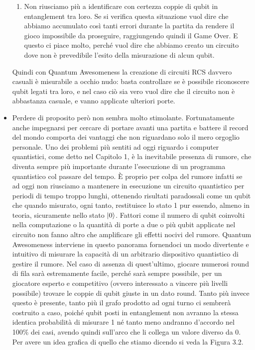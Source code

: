 \documentclass{book}
\theoremstyle{definition}
\theoremstyle{definition}
\theoremstyle{definition}
\theoremstyle{plain}
\theoremstyle{plain}
\theoremstyle{plain}
\theoremstyle{plain}
\begin{document}
\begin{itemize}
\begin{enumerate}
        \item Non riusciamo più a identificare con certezza coppie di qubit in entanglement tra loro. Se si verifica questa situazione vuol dire che abbiamo accumulato così tanti errori durante la partita da rendere il gioco impossibile da proseguire, raggiungendo quindi il Game Over. E questo ci piace molto, perché vuol dire che abbiamo creato un circuito dove non è prevedibile l'esito della misurazione di alcun qubit.
    \end{enumerate}
    Quindi con Quantum Awesomeness la creazione di circuiti RCS davvero casuali è misurabile a occhio nudo: basta controllare se è possibile riconoscere qubit legati tra loro, e nel caso ciò sia vero vuol dire che il circuito non è abbastanza casuale, e vanno applicate ulteriori porte.
    \item Perdere di proposito però non sembra molto stimolante. Fortunatamente anche impegnarsi per cercare di portare avanti una partita e battere il record del mondo comporta dei vantaggi che non riguardano solo il mero orgoglio personale. Uno dei problemi più sentiti ad oggi riguardo i computer quantistici, come detto nel Capitolo 1, è la inevitabile presenza di rumore, che diventa sempre più importante durante l'esecuzione di un programma quantistico col passare del tempo. È proprio per colpa del rumore infatti se ad oggi non riusciamo a mantenere in esecuzione un circuito quantistico per periodi di tempo troppo lunghi, ottenendo risultati paradossali come un qubit che quando misurato, ogni tanto, restituisce lo stato 1 pur essendo, almeno in teoria, sicuramente nello stato $\ket{0}$. %
    Fattori come il numero di qubit coinvolti nella computazione o la quantità di porte a due o più qubit applicate nel circuito non fanno altro che amplificare gli effetti nocivi del rumore. Quantum Awesomeness interviene in questo panorama fornendoci un modo divertente e intuitivo di misurare la capacità di un arbitrario dispositivo quantistico di gestire il rumore. Nel caso di assenza di quest'ultimo, giocare numerosi round di fila sarà estremamente facile, perché sarà sempre possibile, per un giocatore esperto e competitivo (ovvero interessato a vincere più livelli possibile) trovare le coppie di qubit giuste in un dato round. Tanto più invece questo è presente, tanto più il grafo prodotto ad ogni turno ci sembrerà costruito a caso, poiché qubit posti in entanglement non avranno la stessa identica probabilità di misurare 1 né tanto meno andranno d'accordo nel 100\% dei casi, avendo quindi sull'arco che li collega un valore diverso da 0. Per avere un idea grafica di quello che stiamo dicendo si veda la Figura 3.2.

\end{itemize}
\end{document}
